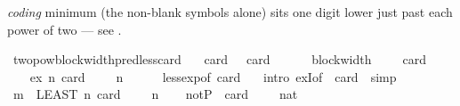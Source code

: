 \begin{isabellebody}
\begin{isamarkuptext}
  \emph{coding} minimum (the non-blank symbols alone) sits one digit
  lower just past each power of two --- see .%
\end{isamarkuptext}\isamarkuptrue%
\isamarkupfalse%
\ two{\isacharunderscore}{\kern0pt}pow{\isacharunderscore}{\kern0pt}block{\isacharunderscore}{\kern0pt}width{\isacharunderscore}{\kern0pt}pred{\isacharunderscore}{\kern0pt}less{\isacharunderscore}{\kern0pt}card{\isacharcolon}{\kern0pt}\isanewline
\ \ \ card{}{\isacharcolon}{\kern0pt}\ {\isachardoublequoteopen}{}\ {\isasymle}\ card\ {\isasymGamma}{\isachardoublequoteclose}\isanewline
\ \ \ {\isachardoublequoteopen}{}\ {\isacharcircum}{\kern0pt}\ {\isacharparenleft}{\kern0pt}block{\isacharunderscore}{\kern0pt}width\ {\isasymGamma}\ {\isacharminus}{\kern0pt}\ {}{\isacharparenright}{\kern0pt}\ {\isacharless}{\kern0pt}\ card\ {\isasymGamma}{\isachardoublequoteclose}\isanewline
%
\isadelimproof
%
\endisadelimproof
%
\isatagproof
{}\isamarkupfalse%
\ {\isacharminus}{\kern0pt}\isanewline
\ \ \isamarkupfalse%
\ ex{\isacharcolon}{\kern0pt}\ {\isachardoublequoteopen}{\isasymexists}n{\isachardot}{\kern0pt}\ card\ {\isasymGamma}\ {\isasymle}\ {}\ {\isacharcircum}{\kern0pt}\ n{\isachardoublequoteclose}\isanewline
\ \ \ \ \isamarkupfalse%
\ less{\isacharunderscore}{\kern0pt}exp{\isacharbrackleft}{\kern0pt}of\ {\isachardoublequoteopen}card\ {\isasymGamma}{\isachardoublequoteclose}{\isacharbrackright}{\kern0pt}\ \isamarkupfalse%
\ {\isacharparenleft}{\kern0pt}intro\ exI{\isacharbrackleft}{\kern0pt}of\ {\isacharunderscore}{\kern0pt}\ {\isachardoublequoteopen}card\ {\isasymGamma}{\isachardoublequoteclose}{\isacharbrackright}{\kern0pt}{\isacharparenright}{\kern0pt}\ simp\isanewline
\ \ \isamarkupfalse%
\ {\isacharquery}{\kern0pt}m\ {\isacharequal}{\kern0pt}\ {\isachardoublequoteopen}LEAST\ n{\isachardot}{\kern0pt}\ card\ {\isasymGamma}\ {\isasymle}\ {}\ {\isacharcircum}{\kern0pt}\ n{\isachardoublequoteclose}\isanewline
\ \ \isamarkupfalse%
\ notP{}{\isacharcolon}{\kern0pt}\ {\isachardoublequoteopen}{\isasymnot}\ card\ {\isasymGamma}\ {\isasymle}\ {}\ {\isacharcircum}{\kern0pt}\ {\isacharparenleft}{\kern0pt}{}{\isacharcolon}{\kern0pt}{\isacharcolon}{\kern0pt}nat{\isacharparenright}{\kern0pt}{\isachardoublequoteclose}\ \isamarkupfalse%

\end{isabellebody}
